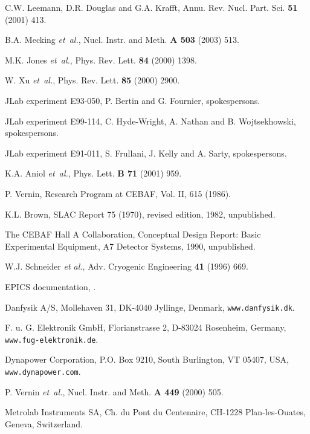 \begin{thebibliography}{99}

C.W. Leemann, D.R. Douglas and G.A. Krafft,
\newblock Annu. Rev. Nucl. Part. Sci. {\bf 51} (2001) 413.

 B.A. Mecking {\em et~al.},
\newblock Nucl. Instr. and Meth. {\bf A 503} (2003) 513.

 M.K. Jones {\em et~al.},
\newblock Phys. Rev. Lett. {\bf 84} (2000) 1398.

 W. Xu {\em et~al.}, 
\newblock Phys. Rev. Lett. {\bf 85} (2000) 2900.

 JLab experiment E93-050,
\newblock P. Bertin and G. Fournier, spokespersons.

 JLab experiment E99-114,
\newblock C. Hyde-Wright, A. Nathan and B. Wojtsekhowski, spokespersons.

 JLab experiment E91-011,
\newblock S. Frullani, J. Kelly and A. Sarty, spokespersons.

 K.A. Aniol {\em et~al.}, 
\newblock Phys. Lett. {\bf B 71} (2001) 959.

 P. Vernin,
\newblock Research Program at CEBAF, Vol. II, 615 (1986).

  K.L. Brown,
\newblock SLAC Report 75 (1970), revised edition, 1982, unpublished.

 The CEBAF Hall A Collaboration,
\newblock Conceptual Design Report:
Basic Experimental Equipment, A7 Detector Systems, 1990, unpublished.

 W.J. Schneider {\it et al.}, 
\newblock Adv. Cryogenic Engineering {\bf 41} (1996) 669.

 EPICS documentation,
.

 Danfysik A/S,
\newblock Mollehaven 31, DK-4040 Jyllinge, Denmark, {\tt www.danfysik.dk}.

 F. u. G. Elektronik GmbH,
\newblock Florianstrasse 2, D-83024 Rosenheim, Germany, {\tt www.fug-elektronik.de}.

 Dynapower Corporation,
\newblock P.O. Box 9210, South Burlington, VT 05407, USA, {\tt www.dynapower.com}.

 P. Vernin {\em et~al.}, 
\newblock Nucl. Instr. and Meth.  {\bf A 449} (2000) 505.

 Metrolab Instruments SA,
 Ch. du Pont du Centenaire, CH-1228 Plan-les-Ouates, 
Geneva, Switzerland.


\end{thebibliography}
